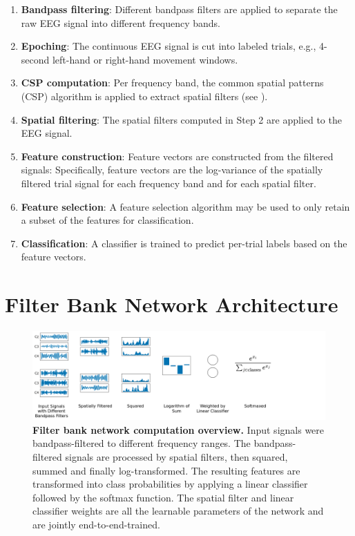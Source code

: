 \begin{enumerate}
\item
  \textbf{Bandpass filtering}: Different bandpass filters are applied to
  separate the raw EEG signal into different frequency bands.
\item
  \textbf{Epoching}: The continuous EEG signal is cut into labeled
  trials, e.g., 4-second left-hand or right-hand movement windows.
\item
  \textbf{CSP computation}: Per frequency band, the common spatial
  patterns (CSP) algorithm is applied to extract spatial filters (see
  ).
\item
  \textbf{Spatial filtering}: The spatial filters computed in Step 2 are
  applied to the EEG signal.
\item
  \textbf{Feature construction}: Feature vectors are constructed from
  the filtered signals: Specifically, feature vectors are the
  log-variance of the spatially filtered trial signal for each frequency
  band and for each spatial filter.
\item
  \textbf{Feature selection}: A feature selection algorithm may be used
  to only retain a subset of the features for classification.
\item
  \textbf{Classification}: A classifier is trained to predict per-trial
  labels based on the feature vectors.
\end{enumerate}

\section{Filter Bank Network
Architecture}\label{filter-bank-network-architecture}

\begin{figure}[ht]
    \myfloatalign
    \includegraphics[width=1\linewidth,trim={0 0 7.5cm 0},clip]{images/filterbank_net_explanation.png}
    \caption[Filter bank network computation overview.]{
\textbf{Filter bank network computation overview.} Input signals were
bandpass-filtered to different frequency ranges. The bandpass-filtered signals are processed by spatial filters, then squared, summed and finally log-transformed. The resulting features are transformed into class probabilities by applying a linear classifier followed by the softmax function. The spatial filter and linear classifier weights are all the learnable parameters of the network and are jointly end-to-end-trained. }\label{filterbank-net-figure}
\end{figure}

